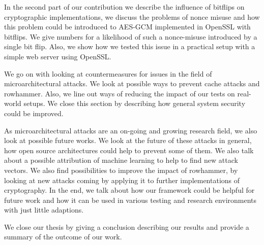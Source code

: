 In the second part of our contribution we describe the influence of bitflips on
cryptographic implementations, we discuss the problems of nonce misuse and how
this problem could be introduced to AES-GCM implemented in OpenSSL with
bitflips. We give numbers for a likelihood of such a nonce-misuse introduced by
a single bit flip. Also, we show how we tested this issue in a practical setup
with a simple web server using OpenSSL.

We go on with looking at countermeasures for issues in the field of
microarchitectural attacks. We look at possible ways to prevent cache attacks
and rowhammer. Also, we line out ways of reducing the impact of our tests on
real-world setups. We close this section by describing how general system
security could be improved.

As microarchitectural attacks are an on-going and growing research field, we
also look at possible future works. We look at the future of these attacks in
general, how open source architectures could help to prevent some of them. We
also talk about a possible attribution of machine learning to help to find new
attack vectors. We also find possibilities to improve the impact of rowhammer,
by looking at new attacks coming by applying it to further implementations of
cryptography. In the end, we talk about how our framework could be helpful for
future work and how it can be used in various testing and research environments
with just little adaptions.

We close our thesis by giving a conclusion describing our results and provide a
summary of the outcome of our work.

